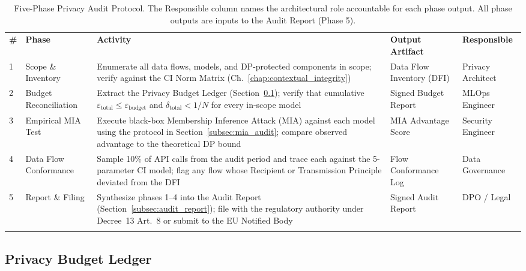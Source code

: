 \begin{table}[ht]
\centering
\caption{Five-Phase Privacy Audit Protocol. The Responsible column names the architectural role accountable for each phase output. All phase outputs are inputs to the Audit Report (Phase 5).}
\label{tab:audit_protocol}
\renewcommand{\arraystretch}{1.3}
\begin{tabular}{p{0.5cm} p{2.4cm} p{4.2cm} p{2.2cm} p{2.6cm}}
\hline\noalign{\smallskip}
\textbf{\#} & \textbf{Phase} & \textbf{Activity} & \textbf{Output Artifact} & \textbf{Responsible} \\
\noalign{\smallskip}\svhline\noalign{\smallskip}
1 & Scope \& Inventory & Enumerate all data flows, models, and DP-protected components in scope; verify against the CI Norm Matrix (Ch.~\ref{chap:contextual_integrity}) & Data Flow Inventory (DFI) & Privacy Architect \\[4pt]
2 & Budget Reconciliation & Extract the Privacy Budget Ledger (Section~\ref{subsec:privacy_budget_ledger}); verify that cumulative $\varepsilon_{\text{total}} \leq \varepsilon_{\text{budget}}$ and $\delta_{\text{total}} < 1/N$ for every in-scope model & Signed Budget Report & MLOps Engineer \\[4pt]
3 & Empirical MIA Test & Execute black-box Membership Inference Attack (MIA) against each model using the protocol in Section~\ref{subsec:mia_audit}; compare observed advantage to the theoretical DP bound & MIA Advantage Score & Security Engineer \\[4pt]
4 & Data Flow Conformance & Sample 10\% of API calls from the audit period and trace each against the 5-parameter CI model; flag any flow whose Recipient or Transmission Principle deviated from the DFI & Flow Conformance Log & Data Governance \\[4pt]
5 & Report \& Filing & Synthesize phases 1--4 into the Audit Report (Section~\ref{subsec:audit_report}); file with the regulatory authority under Decree~13 Art.~8 or submit to the EU Notified Body & Signed Audit Report & DPO / Legal \\
\noalign{\smallskip}\hline\noalign{\smallskip}
\end{tabular}
\end{table}

\subsection{Privacy Budget Ledger}
\label{subsec:privacy_budget_ledger}

